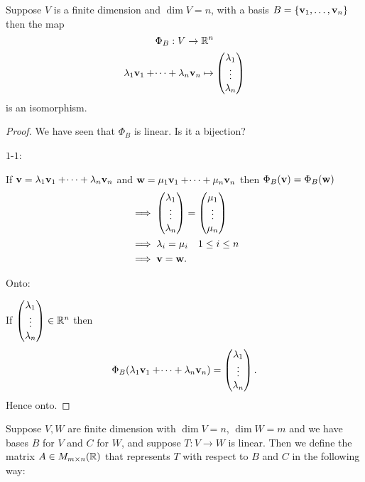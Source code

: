 \documentclass[10pt, a4paper]{article}
\begin{document}
Suppose $V$ is a finite dimension and $\dim{V} = n$,
with a basis $B = \{\mathbf{v}_1, \dotsc, \mathbf{v}_n\}$ then the map
\[
\Phi_B : V \rightarrow \mathbb{R} ^ n
\]
\[
\lambda_1\mathbf{v}_1 + \dotsi + \lambda_n\mathbf{v}_n \mapsto \begin{pmatrix}
    \lambda_1 \\ \vdots \\ \lambda_n
\end{pmatrix}
\]
is an isomorphism.
\begin{proof}
    We have seen that $\Phi_B$ is linear.
    Is it a bijection?

    $1$-$1$:

    If $\mathbf{v} = \lambda_1\mathbf{v}_1 + \dotsi + \lambda_n\mathbf{v}_n$ and $\mathbf{w} = \mu_1\mathbf{v}_1 + \dotsi + \mu_n\mathbf{v}_n$ then $\Phi_B(\mathbf{v}) = \Phi_B(\mathbf{w})$
    \begin{align*}
        &\implies \begin{pmatrix}
            \lambda_1 \\ \vdots \\ \lambda_n
        \end{pmatrix} = \begin{pmatrix}
            \mu_1 \\ \vdots \\ \mu_n
        \end{pmatrix} \\
        &\implies \lambda_i = \mu_i \quad 1 \leq i \leq n \\
        &\implies \mathbf{v} = \mathbf{w}.
    \end{align*}

    Onto:

    If $\begin{pmatrix}
        \lambda_1 \\ \vdots \\ \lambda_n
    \end{pmatrix} \in \mathbb{R} ^ n$ then
    \[
    \Phi_B(\lambda_1\mathbf{v}_1 + \dotsi + \lambda_n\mathbf{v}_n) = \begin{pmatrix}
        \lambda_1 \\ \vdots \\ \lambda_n
    \end{pmatrix}.
    \]
    Hence onto.
\end{proof}

\begin{definition}
    Suppose $V, W$ are finite dimension with $\dim{V} = n$,
    $\dim{W} = m$ and we have bases $B$ for $V$ and $C$ for $W$,
    and suppose $T : V \rightarrow W$ is linear.
    Then we define the matrix $A \in M_{m \times n}(\mathbb{R})$ that represents $T$ with respect to $B$ and $C$ in the following way:
\end{definition}
\end{document}
